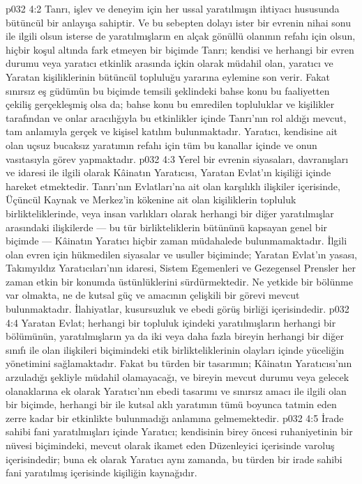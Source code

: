 \vs p032 4:2 Tanrı, işlev ve deneyim için her ussal yaratılmışın ihtiyacı hususunda bütüncül bir anlayışa sahiptir. Ve bu sebepten dolayı ister bir evrenin nihai sonu ile ilgili olsun isterse de yaratılmışların en alçak gönüllü olanının refahı için olsun, hiçbir koşul altında fark etmeyen bir biçimde Tanrı; kendisi ve herhangi bir evren durumu veya yaratıcı etkinlik arasında içkin olarak müdahil olan, yaratıcı ve Yaratan kişiliklerinin bütüncül topluluğu yararına eylemine son verir. Fakat sınırsız eş güdümün bu biçimde temsili şeklindeki bahse konu bu faaliyetten çekiliş gerçekleşmiş olsa da; bahse konu bu emredilen topluluklar ve kişilikler tarafından ve onlar aracılığıyla bu etkinlikler içinde Tanrı’nın rol aldığı mevcut, tam anlamıyla gerçek ve kişisel katılım bulunmaktadır. Yaratıcı, kendisine ait olan uçsuz bucaksız yaratımın refahı için tüm bu kanallar içinde ve onun vasıtasıyla görev yapmaktadır.
\vs p032 4:3 Yerel bir evrenin siyasaları, davranışları ve idaresi ile ilgili olarak Kâinatın Yaratıcısı, Yaratan Evlat’ın kişiliği içinde hareket etmektedir. Tanrı’nın Evlatları’na ait olan karşılıklı ilişkiler içerisinde, Üçüncül Kaynak ve Merkez’in kökenine ait olan kişiliklerin topluluk birlikteliklerinde, veya insan varlıkları olarak herhangi bir diğer yaratılmışlar arasındaki ilişkilerde --- bu tür birlikteliklerin bütününü kapsayan genel bir biçimde --- Kâinatın Yaratıcı hiçbir zaman müdahalede bulunmamaktadır. İlgili olan evren için hükmedilen siyasalar ve usuller biçiminde; Yaratan Evlat’ın yasası, Takımyıldız Yaratıcıları’nın idaresi, Sistem Egemenleri ve Gezegensel Prensler her zaman etkin bir konumda üstünlüklerini sürdürmektedir. Ne yetkide bir bölünme var olmakta, ne de kutsal güç ve amacının çelişkili bir görevi mevcut bulunmaktadır. İlahiyatlar, kusursuzluk ve ebedi görüş birliği içerisindedir.
\vs p032 4:4 Yaratan Evlat; herhangi bir topluluk içindeki yaratılmışların herhangi bir bölümünün, yaratılmışların ya da iki veya daha fazla bireyin herhangi bir diğer sınıfı ile olan ilişkileri biçimindeki etik birlikteliklerinin olayları içinde yüceliğin yönetimini sağlamaktadır. Fakat bu türden bir tasarımın; Kâinatın Yaratıcısı’nın arzuladığı şekliyle müdahil olamayacağı, ve bireyin mevcut durumu veya gelecek olanaklarına ek olarak Yaratıcı’nın ebedi tasarımı ve sınırsız amacı ile ilgili olan bir biçimde, herhangi bir  ile kutsal aklı yaratımın tümü boyunca tatmin eden zerre kadar bir etkinlikte bulunmadığı anlamına gelmemektedir.
\vs p032 4:5 İrade sahibi fani yaratılmışları içinde Yaratıcı; kendisinin birey öncesi ruhaniyetinin bir nüvesi biçimindeki, mevcut olarak ikamet eden Düzenleyici içerisinde varoluş içerisindedir; buna ek olarak Yaratıcı aynı zamanda, bu türden bir irade sahibi fani yaratılmış içerisinde kişiliğin kaynağıdır.
